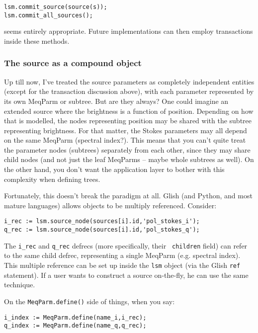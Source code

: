 \documentclass[10pt]{article}
\begin{document}
\begin{verbatim}
lsm.commit_source(source(s));
lsm.commit_all_sources();
\end{verbatim}

seems entirely appropriate. Future implementations can then employ transactions
inside these methods.

\subsubsection{The source as a compound object}

Up till now, I've treated the source parameters as completely independent
entities (except for the transaction discussion above), with each parameter
represented by its own MeqParm or subtree. But are they always? One could
imagine  an extended source where the brightness is a function of position.
Depending on how that is modelled, the nodes representing position may be
shared with the subtree representing brightness. For that matter, the  Stokes
parameters may all depend on the same MeqParm (spectral index?). This means that
you can't quite treat the parameter nodes (subtrees) separately from each
other, since they may share child nodes (and not just the leaf MeqParms --
maybe whole subtrees as well). On the other hand, you don't want the
application layer to bother with this complexity when defining trees.

Fortunately, this doesn't break the paradigm at all. Glish (and Python, and
most mature languages) allows objects to be multiply referenced. Consider:

\begin{verbatim}
i_rec := lsm.source_node(sources[i].id,'pol_stokes_i');
q_rec := lsm.source_node(sources[i].id,'pol_stokes_q');
\end{verbatim}

The {\tt i\_rec} and {\tt q\_rec} defrecs (more specifically, their {\tt
children} field) can refer to the same child defrec, representing a single
MeqParm (e.g. spectral index). This multiple reference can be set up inside the
{\tt lsm} object (via the Glish {\tt ref} statement). If a user wants to
construct a source on-the-fly, he can use the same technique.

On the {\tt MeqParm.define()} side of things, when you say:

\begin{verbatim}
i_index := MeqParm.define(name_i,i_rec);
q_index := MeqParm.define(name_q,q_rec);
\end{verbatim}
\end{document}
